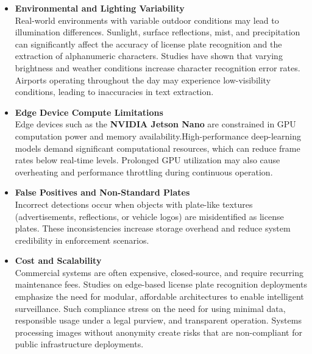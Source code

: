 \documentclass[25pt,a0paper,portrait]{tikzposter}
\begin{document}
\begin{columns}
{{			\begin{itemize}
				\item \textbf{Environmental and Lighting Variability}\\
				Real-world environments with variable outdoor conditions may lead to illumination differences. Sunlight, surface reflections, mist, and precipitation can significantly affect the accuracy of license plate recognition and the extraction of alphanumeric characters. \newline Studies have shown that varying brightness and weather conditions increase character recognition error rates. Airports operating throughout the day may experience low-visibility conditions, leading to inaccuracies in text extraction.\newline
				
				\item \textbf{Edge Device Compute Limitations}\\
				Edge devices such as the \textbf{NVIDIA Jetson Nano} are constrained in GPU computation power and memory availability.\newline High-performance deep-learning models demand significant computational resources, which can reduce frame rates below real-time levels. Prolonged GPU utilization may also cause overheating and performance throttling during continuous operation.\newline
				
				\item \textbf{False Positives and Non-Standard Plates}\\
				Incorrect detections occur when objects with plate-like textures (advertisements, reflections, or vehicle logos) are misidentified as license plates. These inconsistencies increase storage overhead and reduce system credibility in enforcement scenarios. \newline
				
				\item \textbf{Cost and Scalability}\\
				Commercial systems are often expensive, closed-source, and require recurring maintenance fees. Studies on edge-based license plate recognition deployments emphasize the need for modular, affordable architectures to enable intelligent surveillance.\newline
				Such compliance stress on the need for using minimal data, responsible usage under a legal purview, and transparent operation. \newline
				Systems processing images without anonymity create risks that are non-compliant for public infrastructure deployments.\newline
			\end{itemize}
			
}}
\end{columns}
\end{document}
